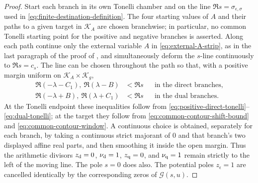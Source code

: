 \begin{proof}
Start each branch in its own Tonelli chamber and on the line
$\Re s=\sigma_{\epsilon,\sigma}$ used in
\eqref{eq:finite-destination-definition}.  The four starting values of $A$
and their paths to a given target in $\mathscr K_A$ are chosen branchwise;
in particular, no common Tonelli starting point for the positive and negative
branches is asserted.  Along each path continue only the external variable
$A$ in \eqref{eq:external-A-strip}, as in the last paragraph of the proof of
, and simultaneously deform the
$s$-line continuously to $\Re s=c_s$.  The line can be chosen throughout the
path so that, with a positive margin uniform on
$\mathscr K_A\times\mathscr K_g$,
\begin{align*}
 \Re(-\lambda-C_1),\ \Re(\lambda-B)&<\Re s
       &&\text{in the direct branches},\\
 \Re(-\lambda+B),\ \Re(\lambda+C_1)&<\Re s
       &&\text{in the dual branches}.
\end{align*}
At the Tonelli endpoint these inequalities follow from
\eqref{eq:positive-direct-tonelli}--\eqref{eq:dual-tonelli}; at the target
they follow from \eqref{eq:common-contour-shift-bound} and
\eqref{eq:common-contour-window}.  A continuous choice is obtained,
separately for each branch, by taking a continuous strict majorant of $0$
and that branch's two displayed affine real parts, and then smoothing it
inside the open margin.  Thus the arithmetic divisors
$z_{\rm d}=0$, $\nu_{\rm d}=1$, $z_{\rm q}=0$, and $\nu_{\rm q}=1$ remain
strictly to the left of the moving line.  The pole $s=0$ does also.  The
potential poles $z_\epsilon=1$ are cancelled identically by the corresponding
zeros of $\mathcal G(s,u)$.


\end{proof}
